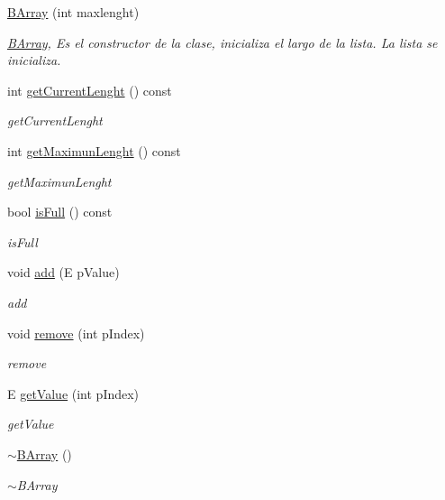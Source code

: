 \begin{DoxyCompactItemize}
\item 
\hyperlink{classBArray_a93c786886ce92be7cf5917bbe6be7956}{B\-Array} (int maxlenght)
\begin{DoxyCompactList}\small\item\em \hyperlink{classBArray}{B\-Array}, Es el constructor de la clase, inicializa el largo de la lista. La lista se inicializa. \end{DoxyCompactList}\item 
int \hyperlink{classBArray_acb72f5d604c4efd007f05c6b6f9746cd}{get\-Current\-Lenght} () const 
\begin{DoxyCompactList}\small\item\em get\-Current\-Lenght \end{DoxyCompactList}\item 
int \hyperlink{classBArray_a744bcd9f9edb779366a116c2b2b96ba7}{get\-Maximun\-Lenght} () const 
\begin{DoxyCompactList}\small\item\em get\-Maximun\-Lenght \end{DoxyCompactList}\item 
bool \hyperlink{classBArray_a2235e8c213fc88b3c6702eaa8c63852c}{is\-Full} () const 
\begin{DoxyCompactList}\small\item\em is\-Full \end{DoxyCompactList}\item 
void \hyperlink{classBArray_ae86ec71c94702d00f70f2e1c026bdce8}{add} (E p\-Value)
\begin{DoxyCompactList}\small\item\em add \end{DoxyCompactList}\item 
void \hyperlink{classBArray_a7c406b4fb7af4b2c124cdc17c31d1a0e}{remove} (int p\-Index)
\begin{DoxyCompactList}\small\item\em remove \end{DoxyCompactList}\item 
E \hyperlink{classBArray_a9ae6755086524e16eb0a6ae4490472bb}{get\-Value} (int p\-Index)
\begin{DoxyCompactList}\small\item\em get\-Value \end{DoxyCompactList}\item 
\hypertarget{classBArray_a06042b7d093d10621aa80cf4af3ea117}{\hyperlink{classBArray_a06042b7d093d10621aa80cf4af3ea117}{$\sim$\-B\-Array} ()}\label{classBArray_a06042b7d093d10621aa80cf4af3ea117}

\begin{DoxyCompactList}\small\item\em $\sim$\-B\-Array \end{DoxyCompactList}\end{DoxyCompactItemize}


